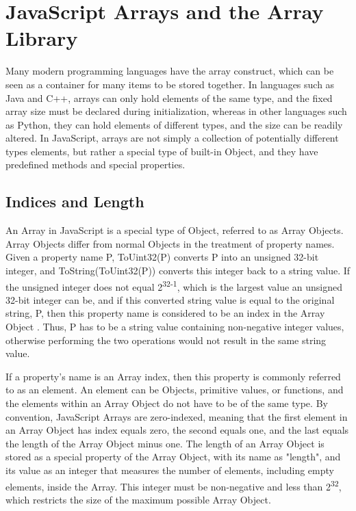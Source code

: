 \documentclass[a4paper,11pt,twoside]{report}
\begin{document}
\chapter{JavaScript Arrays and the Array Library}
Many modern programming languages have the array construct, which can be seen as a container for many items to be stored together. In languages such as Java and C++, arrays can only hold elements of the same type, and the fixed array size must be declared during initialization, whereas in other languages such as Python, they can hold elements of different types, and the size can be readily altered. In JavaScript, arrays are not simply a collection of potentially different types elements, but rather a special type of built-in Object, and they have predefined methods and special properties. 

\section{Indices and Length}
An Array in JavaScript is a special type of Object, referred to as Array Objects. Array Objects differ from normal Objects in the treatment of property names. Given a property name P, ToUint32(P) converts P into an unsigned 32-bit integer, and ToString(ToUint32(P)) converts this integer back to a string value. If the unsigned integer does not equal 2\textsuperscript{32-1}, which is the largest value an unsigned 32-bit integer can be, and if this converted string value is equal to the original string, P, then this property name is considered to be an index in the Array Object \cite{EcmaScript}. Thus, P has to be a string value containing non-negative integer values, otherwise performing the two operations would not result in the same string value. 

If a property's name is an Array index, then this property is commonly referred to as an element. An element can be Objects, primitive values, or functions, and the elements within an Array Object do not have to be of the same type. By convention, JavaScript Arrays are zero-indexed, meaning that the first element in an Array Object has index equals zero, the second equals one, and the last equals the length of the Array Object minus one. The length of an Array Object is stored as a special property of the Array Object, with its name as "length", and its value as an integer that measures the number of elements, including empty elements, inside the Array. This integer must be non-negative and less than 2\textsuperscript{32}, which restricts the size of the maximum possible Array Object. 
\end{document}
